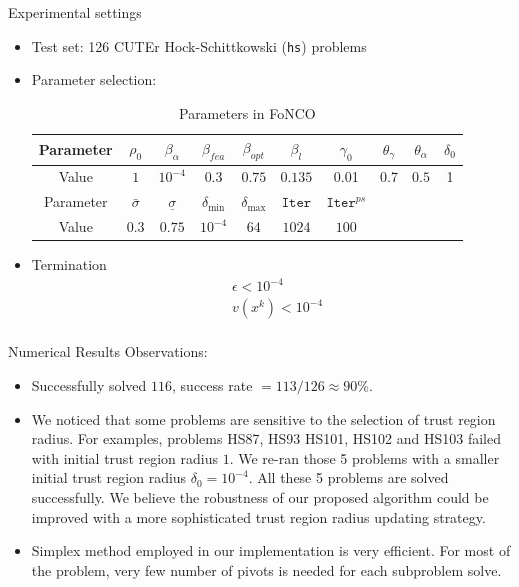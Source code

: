 \documentclass[8pt]{beamer}
\begin{document}
	\begin{frame}{Experimental settings}
		\begin{itemize}
			\item Test set:  126 CUTEr Hock-Schittkowski (\texttt{hs}) problems
		\vfill
			\item Parameter selection:   
				\begin{table}[H]
				\centering
				\caption{Parameters in FoNCO}
				\label{tab.para}
				\begin{tabular}{c|ccccccccc}\hline
					Parameter  & $\rho_0$   &  $\beta_\alpha$  &  $\beta_{fea}$& $\beta_{opt}$ & $\beta_l$                  &  $\gamma_0$  &  $\theta_\gamma$   & $\theta_\alpha$    & $\delta_0$    \\ \hline 
					Value   &   $1$    &  $10^{-4}     $  &  $0.3    $& $0.75$       & $0.135$ &     0.01     &  0.7   &   $0.5$  & 1  \\  \hline\hline

				Parameter &      $\bar\sigma$     &  $\underline{\sigma}$  &  $\delta_{\min} $  &    $\delta_{\max}$      & $\texttt{Iter}$ & $\texttt{Iter}^{ps}$  &  & & \\  \hline
					Value &           $0.3$  &   $0.75$  &  $10^{-4}$       &   $64$  &        $1024$   &  $100$ & & & \\  \hline
				\end{tabular}\end{table}
		\vfill
			\item Termination 
				\begin{equation}\label{relative.kkt}\begin{aligned}
					& \epsilon < 10^{-4} \\
					& v(x^k) < 10^{-4} \\
				\end{aligned}\end{equation}
		\end{itemize}
	\end{frame}


	\begin{frame}{Numerical Results}
		Observations: 
		\vfill
		\begin{itemize}
			\item  Successfully solved $116$, success rate   $  = 113/126 \approx 90 \%$. 
		\vfill
			\item  We noticed that some problems are sensitive to the selection of trust region radius. For examples, problems HS87, HS93 HS101, HS102 and HS103 failed with initial trust region radius $1$. We re-ran those 5 problems with a smaller initial trust region radius $\delta_{0} = 10^{-4}$. All these 5 problems are solved successfully. We believe the robustness of our proposed algorithm could be improved with a more sophisticated trust region radius updating strategy. 
		\vfill
			\item Simplex method employed in our implementation is very efficient. For most of the problem, very few number of pivots is needed for each subproblem solve. 
		\end{itemize}
	\end{frame}
\end{document}

